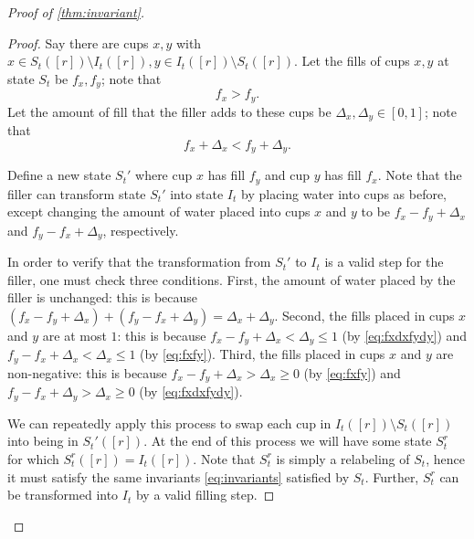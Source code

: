 \documentclass[twocolumn]{article}[10pt]
\begin{document}
\begin{proof}[Proof of \cref{thm:invariant}]
\begin{proof}
Say there are cups $x, y$ with $x\in S_t([r]) \setminus I_t([r]), y \in
 I_t([r])\setminus S_t([r])$. Let the fills of cups $x,y$ at state $S_t$
 be $f_x, f_y$; note that 
 \begin{equation}
     f_x > f_y.
     \label{eq:fxfy}
 \end{equation} Let the amount of fill that the filler
 adds to these cups be $\Delta_x, \Delta_y \in [0,1]$; note that 
 \begin{equation}
 f_x +\Delta_x <f_y + \Delta_y.
 \label{eq:fxdxfydy}
 \end{equation}
 
Define a new state $S_t'$ where cup $x$ has fill $f_y$ and cup $y$ has fill
$f_x$. Note that the filler can transform state $S_t'$ into state $I_t$ by
placing water into cups as before, except changing the amount of water placed
into cups $x$ and $y$ to be  $f_x-f_y+\Delta_x$ and $f_y-f_x + \Delta_y$,
respectively.

In order to verify that the transformation from $S_t'$ to $I_t$ is a valid step
for the filler, one must check three conditions. First, the amount of water
placed by the filler is unchanged: this is because $(f_x-f_y + \Delta_x) +
(f_y-f_x+\Delta_y) = \Delta_x + \Delta_y$. Second, the fills placed in cups $x$
and $y$ are at most $1$: this is because $f_x-f_y+\Delta_x<\Delta_y \le 1$ (by
\eqref{eq:fxdxfydy}) and $f_y-f_x + \Delta_x < \Delta_x \le 1$ (by
\eqref{eq:fxfy}). Third, the fills placed in cups $x$ and $y$ are non-negative:
this is because $f_x-f_y + \Delta_x > \Delta_x \ge 0$ (by \eqref{eq:fxfy})
and $f_y-f_x+\Delta_y > \Delta_x \ge 0$ (by
\eqref{eq:fxdxfydy}). 

We can repeatedly apply this process to swap each cup in $I_t([r])\setminus
S_t([r])$ into being in $S_t'([r])$. At
the end of this process we will have some state $S_t^r$ for which
$S_t^r([r]) = I_t([r])$. Note that $S_t^r$ is simply a relabeling of $S_t$,
hence it must satisfy the same invariants \eqref{eq:invariants} satisfied by
$S_t$. Further, $S_t^r$ can be transformed into $I_t$ by a valid filling step.


\end{proof}
\end{proof}
\end{document}
